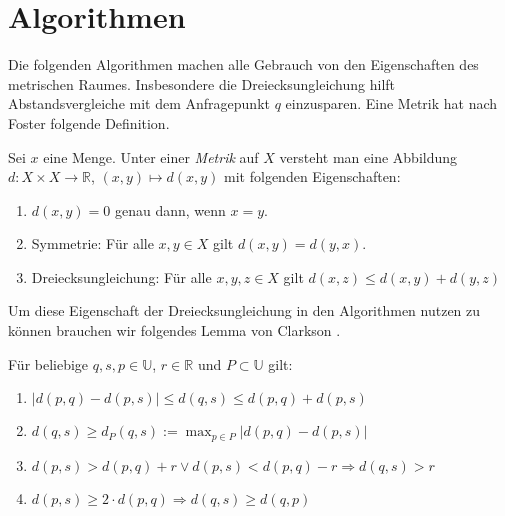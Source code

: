 \documentclass[deutsch,runningheads,a4paper]{llncs}
\begin{document}
  \section{Algorithmen}
    Die folgenden Algorithmen machen alle Gebrauch von den Eigenschaften des metrischen Raumes. Insbesondere die
    Dreiecksungleichung hilft Abstandsvergleiche mit dem Anfragepunkt $q$ einzusparen. Eine Metrik hat nach Foster
    \cite{forster-analysis2} folgende Definition.
    \begin{definition}
      Sei $x$ eine Menge. Unter einer \textit{Metrik} auf $X$ versteht man eine Abbildung
      $d:X \times X \to \mathbb{R}$, $(x, y) \mapsto d(x, y)$ mit folgenden Eigenschaften:
      \begin{enumerate}
      \item $d(x, y) = 0$ genau dann, wenn $x=y$.
      \item Symmetrie: F\"ur alle $x, y \in X$ gilt $d(x, y) = d(y, x)$.
      \item Dreiecksungleichung: F\"ur alle $x, y, z \in X$ gilt $d(x, z) \le d(x, y) + d(y,z)$
      \end{enumerate}
    \end{definition}
    Um diese Eigenschaft der Dreiecksungleichung in den Algorithmen nutzen zu können brauchen wir folgendes Lemma von
    Clarkson \cite{clarkson2005nearest}.
    \begin{lemma}
     F\"ur beliebige $q, s, p \in \mathbb{U}$, $r \in \mathbb{R}$ und $P \subset \mathbb{U}$ gilt:
     \begin{enumerate}
      \item \label{ineq:1}$|d(p, q) - d(p, s)| \le d(q, s) \le d(p, q) + d(p, s)$
      \item \label{ineq:2}$d(q, s) \ge d_P(q, s) := \max_{p \in P}|d(p, q) - d(p, s)|$
      \item \label{ineq:3}$d(p, s) > d(p, q) + r \vee d(p, s) < d(p, q) -r \Rightarrow d(q, s) > r$
      \item \label{ineq:4}$d(p, s) \ge 2 \cdot d(p, q) \Rightarrow d(q, s) \ge d(q, p)$
     \end{enumerate}
    \end{lemma}
    
\end{document}
